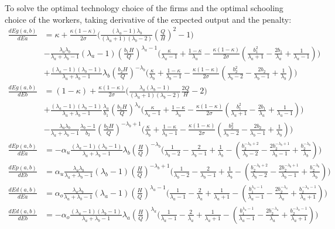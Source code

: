 \documentclass{article}
\newcommand{\1}{\mathbb{1}}
\begin{document}
To solve the optimal technology choice of the firms and the optimal schooling choice of the workers, taking derivative of the expected output and the penalty: 
\begin{align*}
\frac{dEg(a,b)}{dEa} &= \kappa+\frac{\kappa(1-\kappa)}{2\sigma}\Big(\frac{(\lambda_a-1)\lambda_b}{(\lambda_a+1)(\lambda_b-2)}(\frac{Q}{H})^2-1\Big) \\
&-\frac{\lambda_a\lambda_b}{\lambda_a+\lambda_b-1}(\lambda_a-1)(\frac{b_1H}{Q})^{\lambda_a-1}\Big(\frac{\kappa}{\lambda_a-1}+\frac{1-\kappa}{\lambda_a}-\frac{\kappa(1-\kappa)}{2\sigma}(\frac{b_1^2}{\lambda_a+1}-\frac{2b_1}{\lambda_a}+\frac{1}{\lambda_a-1})\Big) \\
&+\frac{(\lambda_a-1)(\lambda_b-1)}{\lambda_a+\lambda_b-1}\lambda_b(\frac{b_2H}{Q})^{-\lambda_b}\Big(\frac{\kappa}{\lambda_b}+\frac{1-\kappa}{\lambda_b-1}-\frac{\kappa(1-\kappa)}{2\sigma}(\frac{b_2^2}{\lambda_b-2}-\frac{2b_2}{\lambda_b-1}+\frac{1}{\lambda_b})\Big) \\
\frac{dEg(a,b)}{dEb} &= (1-\kappa)+\frac{\kappa(1-\kappa)}{2\sigma}\Big(\frac{\lambda_a(\lambda_b-1)}{(\lambda_a+1)(\lambda_b-2)}\frac{2Q}{H}-2\Big) \\
&+\frac{(\lambda_a-1)(\lambda_b-1)}{\lambda_a+\lambda_b-1}\frac{\lambda_a}{b_1}(\frac{b_1H}{Q})^{\lambda_a}\Big(\frac{\kappa}{\lambda_a-1}+\frac{1-\kappa}{\lambda_a}-\frac{\kappa(1-\kappa)}{2\sigma}(\frac{b_1^2}{\lambda_a+1}-\frac{2b_1}{\lambda_a}+\frac{1}{\lambda_a-1})\Big) \\
&-\frac{\lambda_a\lambda_b}{\lambda_a+\lambda_b-1}\frac{\lambda_b-1}{b_2}(\frac{b_2H}{Q})^{-\lambda_b+1}\Big(\frac{\kappa}{\lambda_b}+\frac{1-\kappa}{\lambda_b-1}-\frac{\kappa(1-\kappa)}{2\sigma}(\frac{b_2^2}{\lambda_b-2}-\frac{2b_2}{\lambda_b-1}+\frac{1}{\lambda_b})\Big)
\end{align*}
\begin{align*}
\frac{dEp(a,b)}{dEa} &= -\alpha_u\frac{(\lambda_a-1)(\lambda_b-1)}{\lambda_a+\lambda_b-1}\lambda_b(\frac{H}{Q})^{-\lambda_b}\Big(\frac{1}{\lambda_b-2}-\frac{2}{\lambda_b-1}+\frac{1}{\lambda_b}-(\frac{b_2^{-\lambda_b+2}}{\lambda_b-2}-\frac{2b_2^{-\lambda_b+1}}{\lambda_b-1}+\frac{b_2^{-\lambda_b}}{\lambda_b})\Big) \\
\frac{dEp(a,b)}{dEb} &= \alpha_u\frac{\lambda_a\lambda_b}{\lambda_a+\lambda_b-1}(\lambda_b-1)(\frac{H}{Q})^{-\lambda_b+1}\Big(\frac{1}{\lambda_b-2}-\frac{2}{\lambda_b-1}+\frac{1}{\lambda_b}-(\frac{b_2^{-\lambda_b+2}}{\lambda_b-2}-\frac{2b_2^{-\lambda_b+1}}{\lambda_b-1}+\frac{b_2^{-\lambda_b}}{\lambda_b})\Big) \\
\frac{dEd(a,b)}{dEa} &= \alpha_o\frac{\lambda_a\lambda_b}{\lambda_a+\lambda_b-1}(\lambda_a-1)(\frac{H}{Q})^{\lambda_a-1}\Big(\frac{1}{\lambda_a-1}-\frac{2}{\lambda_a}+\frac{1}{\lambda_a+1}-(\frac{b_1^{\lambda_a-1}}{\lambda_a-1}-\frac{2b_2^{-\lambda_a}}{\lambda_a}+\frac{b_2^{-\lambda_a-1}}{\lambda_a+1})\Big) \\
\frac{dEd(a,b)}{dEb} &=  -\alpha_o\frac{(\lambda_a-1)(\lambda_b-1)}{\lambda_a+\lambda_b-1}\lambda_a(\frac{H}{Q})^{\lambda_a}\Big(\frac{1}{\lambda_a-1}-\frac{2}{\lambda_a}+\frac{1}{\lambda_a+1}-(\frac{b_1^{\lambda_a-1}}{\lambda_a-1}-\frac{2b_2^{-\lambda_a}}{\lambda_a}+\frac{b_2^{-\lambda_a-1}}{\lambda_a+1})\Big) 
\end{align*}
\end{document}
